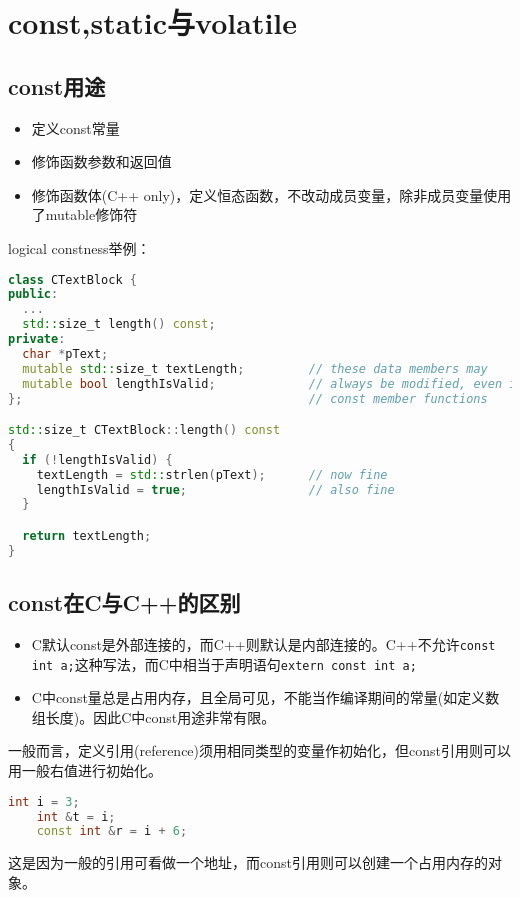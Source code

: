 \section{const,static与volatile}

\subsection{const用途}
\begin{itemize}
    \item 定义const常量
    \item 修饰函数参数和返回值
    \item 修饰函数体(C++ only)，定义恒态函数，不改动成员变量，除非成员变量使用了mutable修饰符
\end{itemize}

logical constness举例：
\begin{lstlisting}[language=C++]
class CTextBlock {
public:
  ...
  std::size_t length() const;
private:
  char *pText;
  mutable std::size_t textLength;         // these data members may
  mutable bool lengthIsValid;             // always be modified, even in
};                                        // const member functions

std::size_t CTextBlock::length() const
{
  if (!lengthIsValid) {
    textLength = std::strlen(pText);      // now fine
    lengthIsValid = true;                 // also fine
  }

  return textLength;
}
\end{lstlisting}


\subsection{const在C与C++的区别}
\begin{itemize}
    \item C默认const是外部连接的，而C++则默认是内部连接的。C++不允许\verb|const int a;|这种写法，而C中相当于声明语句\verb|extern const int a;|
    \item C中const量总是占用内存，且全局可见，不能当作编译期间的常量(如定义数组长度)。因此C中const用途非常有限。
\end{itemize}

一般而言，定义引用(reference)须用相同类型的变量作初始化，但const引用则可以用一般右值进行初始化。
\begin{lstlisting}[language=C++]
    int i = 3;
    int &t = i;
    const int &r = i + 6;
\end{lstlisting}
这是因为一般的引用可看做一个地址，而const引用则可以创建一个占用内存的对象。

